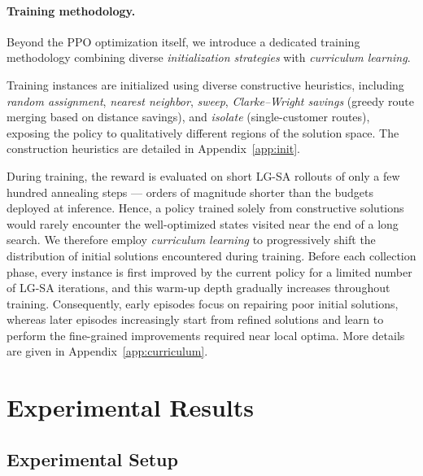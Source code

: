 \documentclass[letterpaper]{article} %
\begin{document}
\paragraph{Training methodology.}
Beyond the PPO optimization itself, we introduce a dedicated training methodology combining diverse \textit{initialization strategies} with \textit{curriculum learning}. 

Training instances are initialized using diverse constructive heuristics, including \textit{random assignment}, \textit{nearest neighbor}, \textit{sweep}, \textit{Clarke--Wright savings} (greedy route merging based on distance savings), and \textit{isolate} (single-customer routes), exposing the policy to qualitatively different regions of the solution space. The construction heuristics are detailed in Appendix~\ref{app:init}.

During training, the reward is evaluated on short LG-SA rollouts of only a few hundred annealing steps --- orders of magnitude shorter than the budgets deployed at inference. Hence, a policy trained solely from constructive solutions would rarely encounter the well-optimized states visited near the end of a long search. We therefore employ \textit{curriculum learning} \citep{ma_learning_2021} to progressively shift the distribution of initial solutions encountered during training. Before each collection phase, every instance is first improved by the current policy for a limited number of LG-SA iterations, and this warm-up depth gradually increases throughout training. Consequently, early episodes focus on repairing poor initial solutions, whereas later episodes increasingly start from refined solutions and learn to perform the fine-grained improvements required near local optima. More details are given in Appendix~\ref{app:curriculum}.


\section{Experimental Results}
\label{sec:experiments}

\subsection{Experimental Setup}
\end{document}

